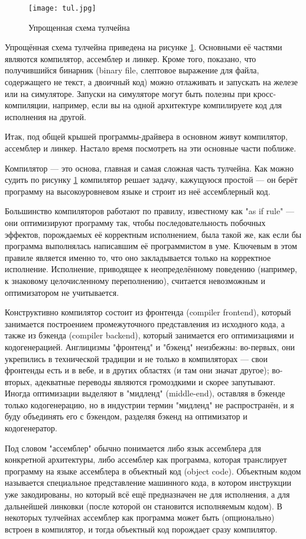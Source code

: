 \begin{figure}[H]
	\centering
	\texttt{[image: tul.jpg]}
	\caption{Упрощенная схема тулчейна}
	\label{fig:tulchain}
\end{figure}

Упрощённая схема тулчейна приведена на рисунке \ref{fig:tulchain}. Основными её частями являются компилятор, ассемблер и линкер. Кроме того, показано, что получившийся бинарник (binary file, слептовое выражение для файла, содержащего не текст, а двоичный код) можно отлаживать и запускать на железе или на симуляторе. Запуски на симуляторе могут быть полезны при кросс-компиляции, например, если вы на одной архитектуре компилируете код для исполнения на другой.

Итак, под общей крышей программы-драйвера в основном живут компилятор, ассемблер и линкер. Настало время посмотреть на эти основные части поближе.

Компилятор — это основа, главная и самая сложная часть тулчейна. Как можно судить по рисунку \ref{fig:tulchain} компилятор решает задачу, кажущуюся простой — он берёт программу на высокоуровневом языке и строит из неё ассемблерный код. 

Большинство компиляторов работают по правилу, известному как "as if rule" — они оптимизируют программу так, чтобы последовательность побочных эффектов, порождаемых её корректным исполнением, была такой же, как если бы программа выполнялась написавшим её программистом в уме. Ключевым в этом правиле является именно то, что оно закладывается только на корректное исполнение. Исполнение, приводящее к неопределённому поведению (например, к знаковому целочисленному переполнению), считается невозможным и оптимизатором не учитывается.

Конструктивно компилятор состоит из фронтенда (compiler frontend), который занимается построением промежуточного представления из исходного кода, а также из бэкенда (compiler backend), который занимается его оптимизациями и кодогенерацией. Англицизмы "фронтенд" и "бэкенд" неизбежны: во-первых, они укрепились в технической традиции и не только в компиляторах — свои фронтенды есть и в вебе, и в других областях (и там они значат другое); во-вторых, адекватные переводы являются громоздкими и скорее запутывают. Иногда оптимизации выделяют в "мидленд" (middle-end), оставляя в бэкенде только кодогенерацию, но в индустрии термин "мидленд" не распространён, и я буду объединять его с бэкендом, разделяя бэкенд на оптимизатор и кодогенератор.

Под словом "ассемблер" обычно понимается либо язык ассемблера для конкретной архитектуры, либо ассемблер как программа, которая транслирует программу на языке ассемблера в объектный код (object code). Объектным кодом называется специальное представление машинного кода, в котором инструкции уже закодированы, но который всё ещё предназначен не для исполнения, а для дальнейшей линковки (после которой он становится исполняемым кодом). В некоторых тулчейнах ассемблер как программа может быть (опционально) встроен в компилятор, и тогда объектный код порождает сразу компилятор.

